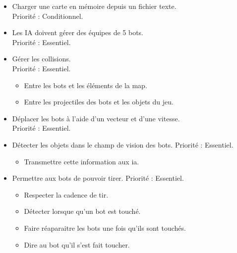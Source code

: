 \documentclass[french]{article}
\begin{document}
    \begin{itemize}

        \item Charger une carte en mémoire depuis un fichier texte. \\
                Priorité : Conditionnel.\\


        \item Les IA doivent gérer des équipes de 5 bots. \\
                Priorité : Essentiel.\\


        \item Gérer les collisions. \\
                Priorité : Essentiel.
                \begin{itemize}
                    \item Entre les bots et les éléments de la map.
                    \item Entre les projectiles des bots et les objets du jeu.\\
                \end{itemize}


        \item Déplacer les bots à l'aide d'un vecteur et d'une vitesse.\\
                Priorité : Essentiel.\\

                
        \item Détecter les objets dans le champ de vision des bots.
            Priorité : Essentiel.
            \begin{itemize}
                \item Transmettre cette information aux ia.\\
            \end{itemize}
        
        \item Permettre aux bots de pouvoir tirer.
            Priorité : Essentiel.
            \begin{itemize}
                \item Respecter la cadence de tir.
                \item Détecter lorsque qu'un bot est touché.
                \item Faire réaparaitre les bots une fois qu'ils sont touchés.
                \item Dire au bot qu'il s'est fait toucher.\\
            \end{itemize}



\end{itemize}
\end{document}
